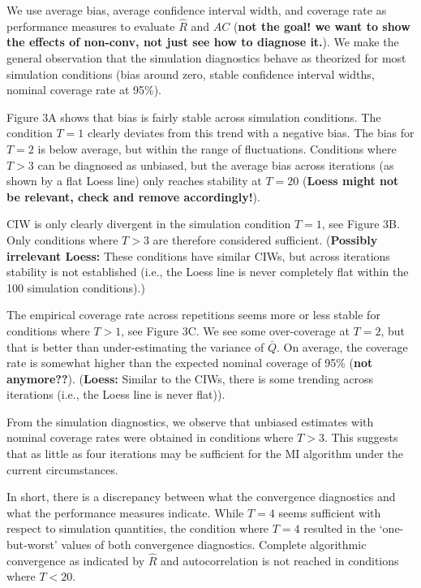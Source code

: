 \documentclass[Royal,times,sageh]{sagej}
\begin{document}
We use average bias, average confidence interval width, and coverage
rate as performance measures to evaluate \(\widehat{R}\) and \(AC\)
(\textbf{not the goal! we want to show the effects of non-conv, not just
see how to diagnose it.}). We make the general observation that the
simulation diagnostics behave as theorized for most simulation
conditions (bias around zero, stable confidence interval widths, nominal
coverage rate at 95\%).

Figure 3A shows that bias is fairly stable across simulation conditions.
The condition \(T=1\) clearly deviates from this trend with a negative
bias. The bias for \(T=2\) is below average, but within the range of
fluctuations. Conditions where \(T>3\) can be diagnosed as unbiased, but
the average bias across iterations (as shown by a flat Loess line) only
reaches stability at \(T=20\) (\textbf{Loess might not be relevant,
check and remove accordingly!}).

CIW is only clearly divergent in the simulation condition \(T=1\), see
Figure 3B. Only conditions where \(T>3\) are therefore considered
sufficient. (\textbf{Possibly irrelevant Loess:} These conditions have
similar CIWs, but across iterations stability is not established (i.e.,
the Loess line is never completely flat within the 100 simulation
conditions).)

The empirical coverage rate across repetitions seems more or less stable
for conditions where \(T>1\), see Figure 3C. We see some over-coverage
at \(T=2\), but that is better than under-estimating the variance of
\(\bar{Q}\). On average, the coverage rate is somewhat higher than the
expected nominal coverage of 95\% \citep{neym34} (\textbf{not
anymore??}). (\textbf{Loess:} Similar to the CIWs, there is some
trending across iterations (i.e., the Loess line is never flat)).

From the simulation diagnostics, we observe that unbiased estimates with
nominal coverage rates were obtained in conditions where \(T>3\). This
suggests that as little as four iterations may be sufficient for the MI
algorithm under the current circumstances.

In short, there is a discrepancy between what the convergence
diagnostics and what the performance measures indicate. While \(T=4\)
seems sufficient with respect to simulation quantities, the condition
where \(T=4\) resulted in the `one-but-worst' values of both convergence
diagnostics. Complete algorithmic convergence as indicated by
\(\widehat{R}\) and autocorrelation is not reached in conditions where
\(T<20\).
\end{document}
